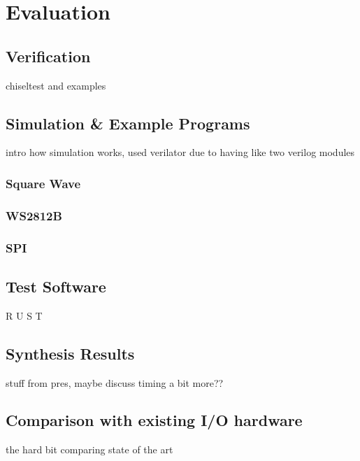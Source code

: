 \chapter{Evaluation}
\label{ch:evaluation}
\section{Verification}
chiseltest and examples
\section{Simulation \& Example Programs}
intro how simulation works, used verilator due to having like two verilog modules
\subsection{Square Wave}
\subsection{WS2812B}
\subsection{SPI}
\section{Test Software}
R U S T
\section{Synthesis Results}
stuff from pres, maybe discuss timing a bit more??

\section{Comparison with existing I/O hardware}
the hard bit comparing state of the art
